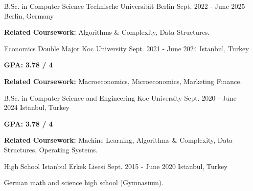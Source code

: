 
\begin{cventries}
  \cventry
    {B.Sc. in Computer Science}
    {Technische Universität Berlin}
    {Sept. 2022 - June 2025}
    {Berlin, Germany}
    {
      \begin{cvitems}
      \item {\textbf{Related Coursework: }Algorithms \& Complexity, Data Structures.}
      \end{cvitems}
    }

  \cventry
    {Economics Double Major}
    {Koc University}
    {Sept. 2021 - June 2024}
    {Istanbul, Turkey}
    {
      \begin{cvitems}
      \item {\textbf{GPA: 3.78 / 4}}
      \item {\textbf{Related Coursework:} Macroeconomics, Microeconomics, Marketing Finance.}
      \end{cvitems}
    }

  \cventry
    {B.Sc. in Computer Science and Engineering}
    {Koc University}
    {Sept. 2020 - June 2024}
    {Istanbul, Turkey}
    {
      \begin{cvitems}
      \item {\textbf{GPA: 3.78 / 4}}
      \item {\textbf{Related Coursework:} Machine Learning, Algorithms \& Complexity, Data Structures, Operating Systems.}
      \end{cvitems}
    }

  \cventry
    {High School}
    {Istanbul Erkek Lisesi}
    {Sept. 2015 - June 2020}
    {Istanbul, Turkey}
    {
      \begin{cvitems}
      \item {German math and science high school (Gymnasium).}
      \end{cvitems}
    }

\end{cventries}
